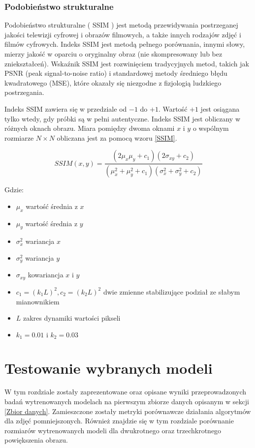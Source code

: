 \documentclass[a4paper,12pt,twoside,openany]{report}
\begin{document}
\subsection{Podobieństwo strukturalne}
Podobieństwo strukturalne ( SSIM ) jest metodą przewidywania postrzeganej jakości telewizji cyfrowej i obrazów filmowych, a także innych rodzajów zdjęć i filmów cyfrowych. Indeks SSIM jest metodą pełnego porównania, innymi słowy, mierzy jakość w oparciu o oryginalny obraz (nie skompresowany lub bez zniekształceń). Wskaźnik SSIM jest rozwinięciem tradycyjnych metod, takich jak PSNR (peak signal-to-noise ratio) i standardowej metody średniego błędu kwadratowego (MSE), które okazały się niezgodne z fizjologią ludzkiego postrzegania. 

Indeks SSIM zawiera się w przedziale od $-1$ do $+1$. Wartość $+1$ jest osiągana tylko wtedy, gdy próbki są w pełni autentyczne. Indeks SSIM jest obliczany w różnych oknach obrazu. Miara pomiędzy dwoma oknami $x$ i $y$ o wspólnym rozmiarze $N \times N$ obliczana jest za pomocą wzoru \ref{SSIM}. 

\begin{equation}
	SSIM(x,y)= \frac{(2\mu_x\mu_y+c_1)(2\sigma_{xy}+c_2)}{(\mu_x^2+\mu_y^2+c_1)(\sigma_x^2+\sigma_y^2+c_2)}
	\label{SSIM}
\end{equation}

Gdzie: 
\begin{itemize}
	\item $\mu_x$ wartość średnia z $x$
	\item $\mu_y$ wartość średnia z $y$
	\item $\sigma_x^2$ wariancja $x$
	\item $\sigma_y^2$ wariancja $y$
	\item $\sigma_{xy}$ kowariancja $x$ i $y$
	\item $c_1=(k_1L)^2, c_2=(k_2L)^2$ dwie zmienne stabilizujące podział ze słabym mianownikiem
	\item $L$ zakres dynamiki wartości pikseli 
	\item $k_1=0.01$ i $k_2=0.03$
\end{itemize}
\chapter{Testowanie wybranych  modeli}
	W tym rozdziale zostały zaprezentowane oraz opisane wyniki przeprowadzonych badań wytrenowanych modelach na pierwszym zbiorze danych opisanym w sekcji \ref{Zbior danych}. Zamieszczone zostały metryki porównawcze działania algorytmów dla zdjęć pomniejszonych. Również znajdzie się w tym rozdziale porównanie rozmiarów wytrenowanych modeli dla dwukrotnego oraz trzechkrotnego powiększenia obrazu.
\end{document}
